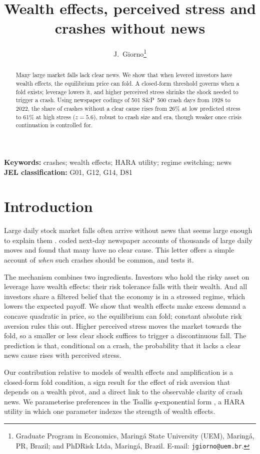 \documentclass[11pt,a4paper]{article}
\title{\textbf{Wealth effects, perceived stress and crashes without news}}
\author{J.~Giorno\thanks{Graduate Program in Economics, Maring\'a State University (UEM),
Maring\'a, PR, Brazil; and PhDRisk Ltda, Maring\'a, Brazil. E-mail: \texttt{jgiorno@uem.br}.}}
\date{}
\begin{document}
\maketitle

\begin{abstract}
\noindent Many large market falls lack clear news. We show that when levered investors
have wealth effects, the equilibrium price can fold. A closed-form threshold governs when a
fold exists; leverage lowers it, and higher perceived stress shrinks the shock needed to
trigger a crash. Using newspaper codings of 501 S\&P~500 crash days from 1928 to 2022, the
share of crashes without a clear cause rises from 26\% at low predicted stress to 61\% at high
stress ($z=5.6$), robust to crash size and era, though weaker once crisis continuation is
controlled for.
\end{abstract}

\noindent\textbf{Keywords:} crashes; wealth effects; HARA utility; regime switching; news\\
\textbf{JEL classification:} G01, G12, G14, D81

\section{Introduction}

Large daily stock market falls often arrive without news that seems large enough to explain
them \citep{CutlerPoterbaSummers1989}. \citet{BBDS2021} coded next-day newspaper accounts of
thousands of large daily moves and found that many have no clear cause. This letter offers a
simple account of \emph{when} such crashes should be common, and tests it.

The mechanism combines two ingredients. Investors who hold the risky asset on leverage have
wealth effects: their risk tolerance falls with their wealth. And all investors share a
filtered belief that the economy is in a stressed regime, which lowers the expected payoff.
We show that wealth effects make excess demand a concave quadratic in price, so the
equilibrium can fold; constant absolute risk aversion rules this out. Higher perceived
stress moves the market towards the fold, so a smaller or less clear shock suffices to
trigger a discontinuous fall. The prediction is that, conditional on a crash, the
probability that it lacks a clear news cause rises with perceived stress.

Our contribution relative to models of wealth effects and amplification
\citep{GennotteLeland1990,KyleXiong2001,BrunnermeierPedersen2009} is a closed-form fold
condition, a sign result for the effect of risk aversion that depends on a wealth pivot, and
a direct link to the observable clarity of crash news. We parameterise preferences in the
Tsallis $q$-exponential form \citep{Tsallis1988}, a HARA utility \citep{Merton1971} in which
one parameter indexes the strength of wealth effects.
\end{document}
